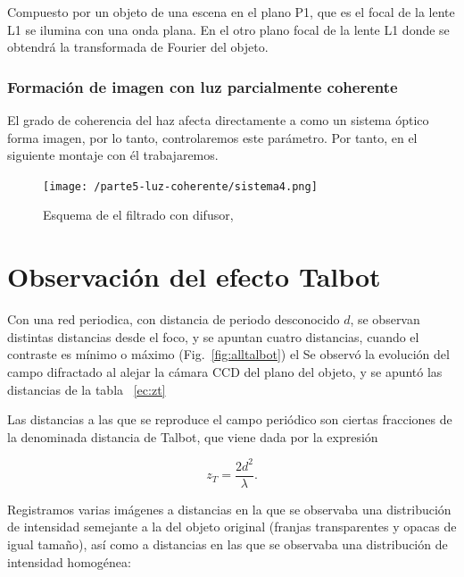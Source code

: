 \documentclass{./packages/optica-article}
\begin{document}
	      Compuesto por un objeto de una escena en el plano P1, que es el focal de la lente L1 se ilumina con una onda plana. En el otro plano focal de la lente L1 donde se obtendrá la transformada de Fourier del objeto.

\subsubsection{Formación de imagen con luz parcialmente coherente}

	      El grado de coherencia del haz afecta directamente a como un sistema óptico forma imagen, por lo tanto, controlaremos este parámetro. Por tanto, en el siguiente montaje con él trabajaremos.

	      \begin{figure}[h]
		      \centering
		      \texttt{[image: /parte5-luz-coherente/sistema4.png]}
		      \caption{Esquema de el filtrado con difusor, }
		      \label{fig:coherenciaespacial}
	      \end{figure}






\section{Observación del efecto Talbot}
Con una red periodica, con distancia de periodo desconocido $d$, se observan  distintas distancias desde el foco, y se apuntan cuatro distancias, cuando el contraste es mínimo o máximo (Fig.~\ref{fig:alltalbot}) el Se observó la evolución del campo difractado al alejar la cámara CCD del plano del objeto, y se apuntó las distancias de la tabla ~\ref{ec:zt}

Las distancias a las que se reproduce el campo periódico son ciertas fracciones de la denominada distancia de Talbot, que viene dada por la expresión

\begin{equation}
		z_T = \frac{2d^2}{\lambda}.
		\label{ec:zt}
\end{equation}


Registramos varias imágenes a distancias en la que se observaba una distribución de intensidad semejante a la del objeto original (franjas transparentes y opacas de igual tamaño), así como a distancias en las que se observaba una distribución de intensidad homogénea:\par
\end{document}
